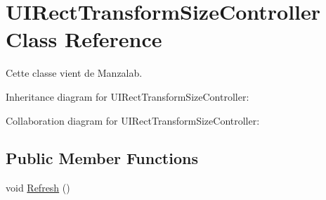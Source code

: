 \hypertarget{class_u_i_rect_transform_size_controller}{}\section{U\+I\+Rect\+Transform\+Size\+Controller Class Reference}
\label{class_u_i_rect_transform_size_controller}


Cette classe vient de Manzalab.  




Inheritance diagram for U\+I\+Rect\+Transform\+Size\+Controller\+:


Collaboration diagram for U\+I\+Rect\+Transform\+Size\+Controller\+:
\subsection*{Public Member Functions}
\begin{DoxyCompactItemize}
\item 
void \hyperlink{class_u_i_rect_transform_size_controller_a1888cd7aeff2ef7b3c02dabab2e8ae3d}{Refresh} ()
\end{DoxyCompactItemize}
